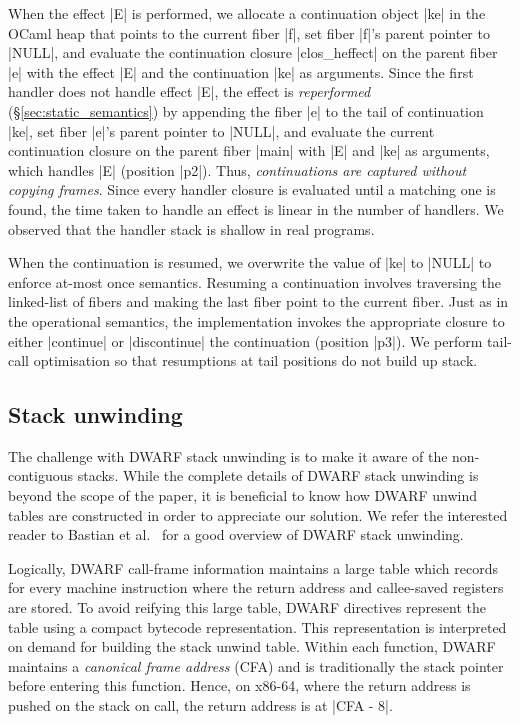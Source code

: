 \documentclass[sigplan,screen]{acmart}
\begin{document}
When the effect |E| is performed, we allocate a continuation object |ke| in the
OCaml heap that points to the current fiber |f|, set fiber |f|'s parent pointer
to |NULL|, and evaluate the continuation closure |clos_heffect| on the parent
fiber |e| with the effect |E| and the continuation |ke| as arguments. Since the
first handler does not handle effect |E|, the effect is \emph{reperformed}
(\S\ref{sec:static_semantics}) by appending the fiber |e| to the tail of
continuation |ke|, set fiber |e|'s parent pointer to |NULL|, and evaluate the
current continuation closure on the parent fiber |main| with |E| and |ke| as
arguments, which handles |E| (position |p2|). Thus, \emph{continuations are
captured without copying frames}. Since every handler closure is evaluated
until a matching one is found, the time taken to handle an effect is linear in
the number of handlers. We observed that the handler stack is shallow in real
programs.

When the continuation is resumed, we overwrite the value of |ke| to |NULL| to
enforce at-most once semantics. Resuming a continuation involves traversing the
linked-list of fibers and making the last fiber point to the current fiber.
Just as in the operational semantics, the implementation invokes the
appropriate closure to either |continue| or |discontinue| the continuation
(position |p3|). We perform tail-call optimisation so that resumptions at tail
positions do not build up stack.

\subsection{Stack unwinding}

The challenge with DWARF stack unwinding is to make it aware of the
non-contiguous stacks. While the complete details of DWARF stack unwinding is
beyond the scope of the paper, it is beneficial to know how DWARF unwind tables
are constructed in order to appreciate our solution. We refer the interested
reader to Bastian et al.~\cite{Bastian19} for a good overview of DWARF stack
unwinding.

Logically, DWARF call-frame information maintains a large table which records
for every machine instruction where the return address and callee-saved
registers are stored. To avoid reifying this large table, DWARF directives
represent the table using a compact bytecode representation. This representation
is interpreted on demand for building the stack unwind table. Within each
function, DWARF maintains a \emph{canonical frame address} (CFA) and is
traditionally the stack pointer before entering this function. Hence, on x86-64,
where the return address is pushed on the stack on call, the return address is
at |CFA - 8|.
\end{document}
